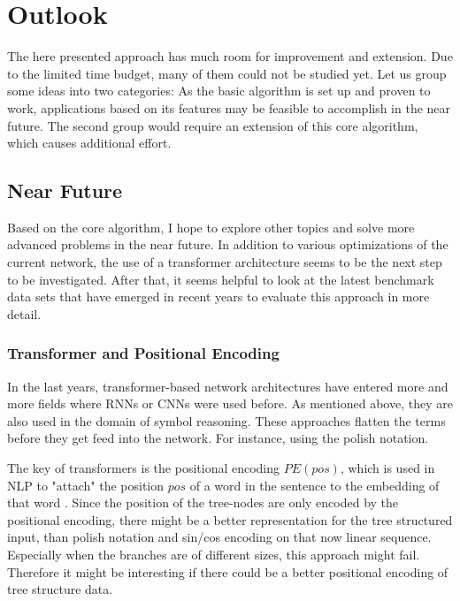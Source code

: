 \documentclass{scrartcl}
\theoremstyle{definition}
\begin{document}
\section{Outlook}

The here presented approach has much room for improvement and extension.
Due to the limited time budget, many of them could not be studied yet.
Let us group some ideas into two categories:
As the basic algorithm is set up and proven to work, applications based on its features may be feasible to accomplish in the near future.
The second group would require an extension of this core algorithm, which causes additional effort.

\subsection{Near Future}

Based on the core algorithm, I hope to explore other topics and solve more advanced problems in the near future.
In addition to various optimizations of the current network, the use of a transformer architecture seems to be the next step to be investigated.
After that, it seems helpful to look at the latest benchmark data sets that have emerged in recent years to evaluate this approach in more detail.

\subsubsection{Transformer and Positional Encoding}

In the last years, transformer-based network architectures have entered more and more fields where RNNs or CNNs were used before.
As mentioned above, they are also used in the domain of symbol reasoning.
These approaches flatten the terms before they get feed into the network.
For instance, using the polish notation.

The key of transformers is the positional encoding $PE\left( pos\right)$, which is used in NLP to "attach" the position $pos$ of a word in the sentence to the embedding of that word \cite{vaswani2017attention}.
Since the position of the tree-nodes are only encoded by the positional encoding, there might be a better representation for the tree structured input,
than polish notation and sin/cos encoding on that now linear sequence.
Especially when the branches are of different sizes, this approach might fail.
Therefore it might be interesting if there could be a better positional encoding of tree structure data.
\end{document}
